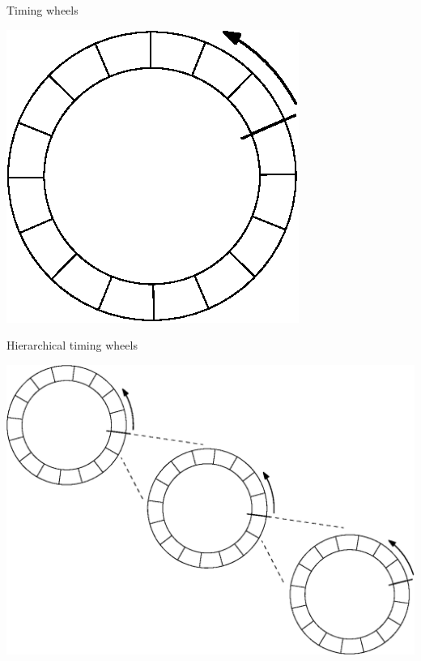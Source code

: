 \documentclass{beamer}
\begin{document}


\begin{frame}{Timing wheels}
  \begin{center}
    \includegraphics{timing-wheel.eps}
  \end{center}
\end{frame}




\begin{frame}{Hierarchical timing wheels}
  \begin{center}
    \includegraphics[width=\textwidth]{hierarchical-timing-wheels.eps}
  \end{center}
\end{frame}
\end{document}
